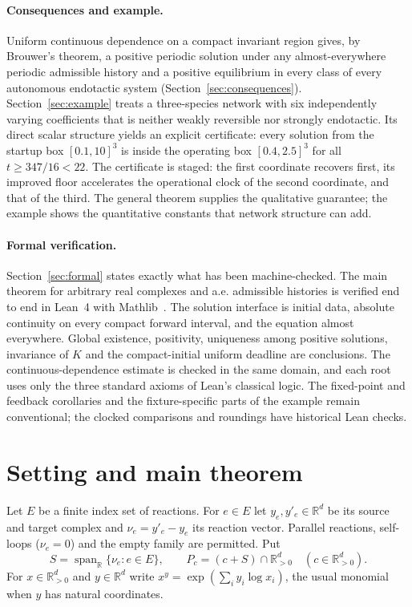 \documentclass[11pt]{article}
\theoremstyle{definition}
\theoremstyle{remark}
\newcommand{\R}{\mathbb R}
\newcommand{\U}{\R_{>0}^{d}}
\DeclareMathOperator{\spanR}{span}
\begin{document}
\paragraph{Consequences and example.}
Uniform continuous dependence on a compact invariant region gives, by Brouwer's
theorem, a positive periodic solution under any almost-everywhere periodic
admissible history and a positive equilibrium in every class of every autonomous
endotactic system (Section~\ref{sec:consequences}). Section~\ref{sec:example}
treats a three-species network with six independently varying coefficients that
is neither weakly reversible nor strongly endotactic. Its direct scalar structure
yields an explicit certificate: every solution from the startup box $[0.1,10]^3$
is inside the operating box $[0.4,2.5]^3$ for all $t\ge347/16<22$. The certificate
is staged: the first coordinate recovers first, its improved floor accelerates the
operational clock of the second coordinate, and that of the third. The general
theorem supplies the qualitative guarantee; the example shows the quantitative
constants that network structure can add.

\paragraph{Formal verification.}
Section~\ref{sec:formal} states exactly what has been machine-checked. The main
theorem for arbitrary real complexes and a.e. admissible histories is verified
end to end in Lean~4 with Mathlib~\cite{Lean4,Mathlib2020}. The solution interface
is initial data, absolute continuity on every compact forward interval, and the
equation almost everywhere. Global existence, positivity, uniqueness among
positive solutions, invariance of $K$ and the compact-initial uniform deadline
are conclusions. The continuous-dependence estimate is checked in the same
domain, and each root uses only the three standard axioms of Lean's classical
logic. The fixed-point and feedback corollaries and the fixture-specific parts
of the example remain conventional; the clocked comparisons and roundings have
historical Lean checks.

\section{Setting and main theorem}\label{sec:setting}

Let $E$ be a finite index set of reactions. For $e\in E$ let $y_e,y'_e\in\R^d$
be its source and target complex and $\nu_e=y'_e-y_e$ its reaction vector. Parallel
reactions, self-loops ($\nu_e=0$) and the empty family are permitted. Put
\[
 S=\spanR_{\R}\{\nu_e:e\in E\},\qquad P_c=(c+S)\cap\U\quad(c\in\U).
\]
For $x\in\U$ and $y\in\R^d$ write $x^{y}=\exp(\sum_i y_i\log x_i)$, the
usual monomial when $y$ has natural coordinates.
\end{document}
